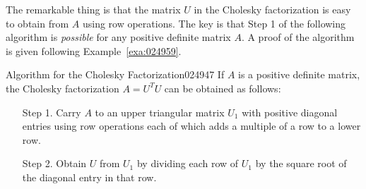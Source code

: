 The remarkable thing is that the matrix $U$ in the Cholesky factorization is easy to obtain from $A$ using row operations. The key is that Step 1 of the following algorithm is \textit{possible} for any positive definite matrix $A$. A proof of the algorithm is given following Example~\ref{exa:024959}.


\begin{theorem*}{Algorithm for the Cholesky Factorization}{024947}
If $A$ is a positive definite matrix, the Cholesky factorization $A = U^{T}U$ can be obtained as follows:


\begin{itemize}[leftmargin=4em]
\item[Step 1.] Carry $A$ to an upper triangular matrix $U_{1}$ with positive diagonal entries using row operations each of which adds a multiple of a row to a lower row.

\item[Step 2.] Obtain $U$ from $U_{1}$ by dividing each row of $U_{1}$ by the square root of the diagonal entry in that row.

\end{itemize}
\end{theorem*}


